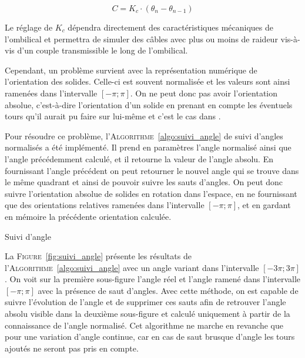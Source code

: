 				\begin{equation}
					C = K_c \cdot (\theta_n - \theta_{n - 1})
				\end{equation}

				Le réglage de $K_c$ dépendra directement des caractéristiques mécaniques de l'ombilical et permettra de simuler des câbles avec plus ou moins de raideur vis-à-vis d'un couple transmissible le long de l'ombilical.
				
				Cependant, un problème survient avec la représentation numérique de l'orientation des solides. Celle-ci est souvent normalisée et les valeurs sont ainsi ramenées dans l'intervalle $[-\pi; \pi]$. On ne peut donc pas avoir l'orientation absolue, c’est-à-dire l'orientation d'un solide en prenant en compte les éventuels tours qu'il aurait pu faire sur lui-même et c'est le cas dans \gazebo{}.
			
				Pour résoudre ce problème, l'\textsc{Algorithme}~\ref{algo:suivi_angle} de suivi d'angles normalisés a été implémenté. Il prend en paramètres l'angle normalisé ainsi que l'angle précédemment calculé, et il retourne la valeur de l'angle absolu. En fournissant l'angle précédent on peut retourner le nouvel angle qui se trouve dans le même quadrant et ainsi de pouvoir suivre les sauts d'angles. On peut donc suivre l'orientation absolue de solides en rotation dans l'espace, en ne fournissant que des orientations relatives ramenées dans l'intervalle $[-\pi; \pi]$, et en gardant en mémoire la précédente orientation calculée.
				
				\begin{algorithm}[!htb]
			
					\caption{Suivi d'angle} 
					\label{algo:suivi_angle}
				\end{algorithm}
			
				La \textsc{Figure}~\ref{fig:suivi_angle} présente les résultats de l'\textsc{Algorithme}~\ref{algo:suivi_angle} avec un angle variant dans l'intervalle $[-3\pi; 3\pi]$. On voit sur la première sous-figure l'angle réel et l'angle ramené dans l'intervalle $[-\pi; \pi]$ avec la présence de saut d'angles. Avec cette méthode, on est capable de suivre l'évolution de l'angle et de supprimer ces sauts afin de retrouver l'angle absolu visible dans la deuxième sous-figure et calculé uniquement à partir de la connaissance de l'angle normalisé. Cet algorithme ne marche en revanche que pour une variation d'angle continue, car en cas de saut brusque d'angle les tours ajoutés ne seront pas pris en compte.
			
